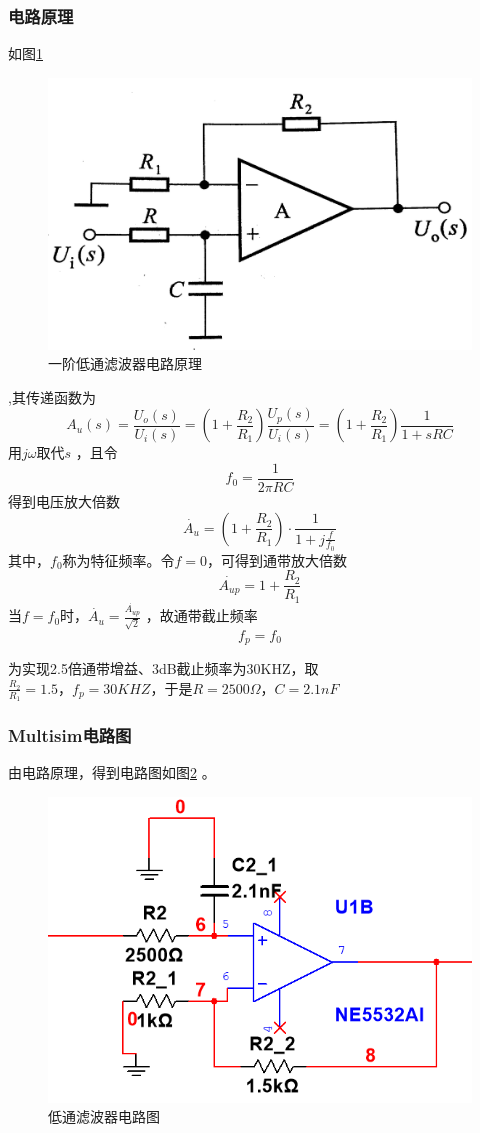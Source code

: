 \documentclass[12pt]{article}
\begin{document}
\subsubsection{电路原理}
如图\ref{yjdtlbq}
\begin{figure}[htbp]
  \centering
  \includegraphics[width=.5\textwidth]{picture/P2}
  \caption{一阶低通滤波器电路原理}\label{yjdtlbq}
\end{figure}
,其传递函数为
\begin{equation}\label{cdhs}
  A_u(s)=\frac{U_o(s)}{U_i(s)}=\left(1+\frac{R_2}{R_1}\right) \frac{U_p(s)}{U_i(s)}=\left(1+\frac{R_2}{R_1}\right)\frac{1}{1+sRC}
\end{equation}
用$j\omega$取代$s$ ，且令
\begin{equation}\label{qudai}
  f_0=\frac{1}{2\pi RC}
\end{equation}
得到电压放大倍数
\begin{equation}\label{dyfdbs}
  \dot{A_u}=\left(1+\frac{R_2}{R_1}\right)\cdot\frac{1}{1+j\frac{f}{f_0}}
\end{equation}
其中，$f_0$称为特征频率。令$f=0$，可得到通带放大倍数
\begin{equation}\label{tdfdbs}
  \dot{A_{up}}=1+\frac{R_2}{R_1}
\end{equation}
当$f=f_0$时，$\dot{A_u}=\frac{\dot{A_{up}}}{\sqrt{2}}$ ，故通带截止频率
\begin{equation}\label{tdjzpl}
  f_p=f_0
\end{equation}\par
为实现2.5倍通带增益、3dB截止频率为30KHZ，取$\frac{R_2}{R_1}=1.5\mbox{，}f_p=30KHZ\mbox{，于是}R=2500\Omega\mbox{，}C=2.1nF$
\subsubsection{Multisim电路图}
由电路原理，得到电路图如图\ref{qzzydlt11}
。
\begin{figure}[htbp]
  \centering
  \includegraphics[width=.6\textwidth]{picture/TIM20190505131858}
  \caption{低通滤波器电路图}\label{qzzydlt11}
\end{figure}
\end{document}

